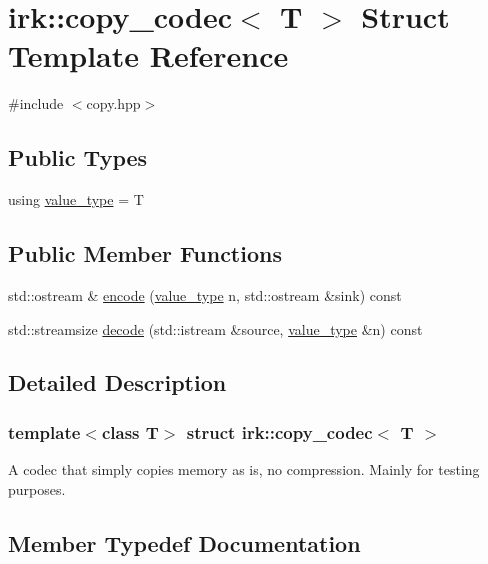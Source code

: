 \hypertarget{structirk_1_1copy__codec}{}\section{irk\+:\+:copy\+\_\+codec$<$ T $>$ Struct Template Reference}
\label{structirk_1_1copy__codec}


{\ttfamily \#include $<$copy.\+hpp$>$}

\subsection*{Public Types}
\begin{DoxyCompactItemize}
\item 
using \mbox{\hyperlink{structirk_1_1copy__codec_a6a94e8da5a0a582eaa667741175a3c05}{value\+\_\+type}} = T
\end{DoxyCompactItemize}
\subsection*{Public Member Functions}
\begin{DoxyCompactItemize}
\item 
std\+::ostream \& \mbox{\hyperlink{structirk_1_1copy__codec_a72a66688818ee37592ee6fe5e25ec3cb}{encode}} (\mbox{\hyperlink{structirk_1_1copy__codec_a6a94e8da5a0a582eaa667741175a3c05}{value\+\_\+type}} n, std\+::ostream \&sink) const
\item 
std\+::streamsize \mbox{\hyperlink{structirk_1_1copy__codec_ac72b2a5dbfdf57e39f7ed1d12d7bb8f3}{decode}} (std\+::istream \&source, \mbox{\hyperlink{structirk_1_1copy__codec_a6a94e8da5a0a582eaa667741175a3c05}{value\+\_\+type}} \&n) const
\end{DoxyCompactItemize}


\subsection{Detailed Description}
\subsubsection*{template$<$class T$>$\newline
struct irk\+::copy\+\_\+codec$<$ T $>$}

A codec that simply copies memory as is, no compression. Mainly for testing purposes. 

\subsection{Member Typedef Documentation}
\mbox{\label{structirk_1_1copy__codec_a6a94e8da5a0a582eaa667741175a3c05}} 
